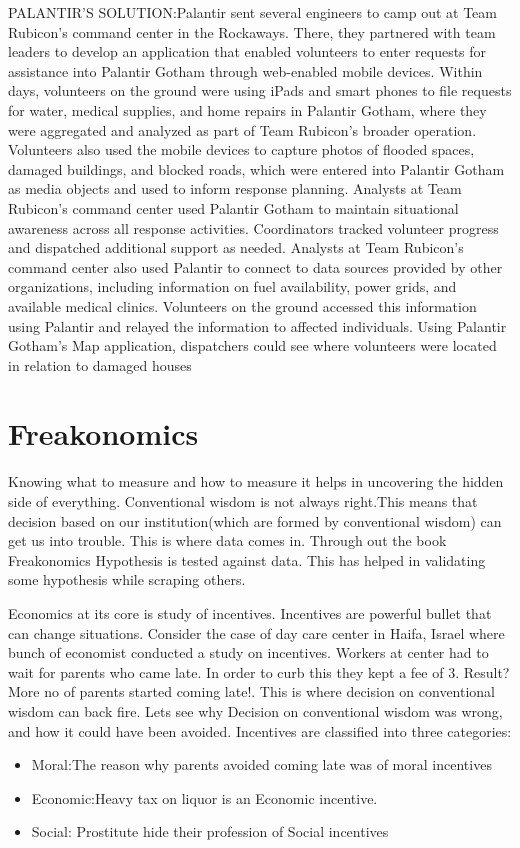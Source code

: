 \documentclass[AER]{AEA}
\begin{document}
PALANTIR’S SOLUTION:Palantir sent several engineers to camp out at Team Rubicon’s command center in the Rockaways. There, they partnered with team leaders to develop an application that enabled volunteers to enter requests for assistance into Palantir Gotham through web-enabled mobile devices. Within days, 
volunteers on the ground were using iPads and smart phones to file requests for water, medical supplies, and home repairs in Palantir Gotham, where they were aggregated and analyzed as part of Team Rubicon’s broader operation. Volunteers also used the mobile devices to capture photos of 
flooded spaces, damaged buildings, and blocked roads, which were entered into Palantir Gotham as media objects and used to inform response planning. 
Analysts at Team Rubicon’s command center used Palantir Gotham to maintain situational awareness across all response activities. Coordinators tracked volunteer progress and dispatched additional support as needed. Analysts at Team Rubicon’s command center also used Palantir to connect to data sources provided by other organizations, including information on fuel availability, power grids, and available medical clinics. Volunteers on the ground accessed this information using Palantir and relayed the information to affected individuals. Using Palantir Gotham’s Map application, dispatchers could see where volunteers were located in relation to damaged houses

\section{Freakonomics}
Knowing what to measure and how to measure it helps in uncovering the hidden side of everything. Conventional wisdom is not always right.This means that decision based on our institution(which are formed by conventional wisdom) can get us into trouble. This is where data comes in. Through out the book Freakonomics Hypothesis is tested against data. This has helped in validating some hypothesis while scraping others.

	Economics at its core is study of incentives. Incentives are powerful bullet that can change situations. Consider the case of day care center in Haifa, Israel where bunch of economist conducted a study on incentives. Workers at center had to wait for parents who came late. In order to curb this they kept a fee of 3. Result? More no of parents started coming late!.
	This is where decision on conventional wisdom can back fire. Lets see why Decision on conventional wisdom was wrong, and how it could have been avoided. Incentives are classified into three categories:
\begin{itemize}
\item Moral:The reason why parents avoided coming late was of moral incentives
\item Economic:Heavy tax on liquor is an Economic incentive.
\item Social: Prostitute hide their profession of Social incentives
\end{itemize}
\end{document}
